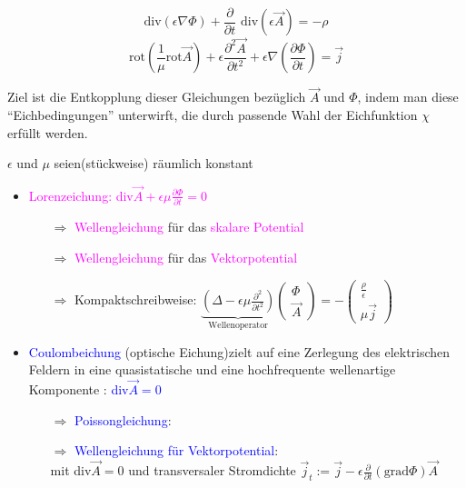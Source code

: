 \documentclass[]{article}
\begin{document}
	\begin{boxedminipage}[green]{\textwidth}
		$$\text{div}(\epsilon\nabla\Phi)+\frac{∂}{∂t}\text{ div}(\epsilon\vec{A})=-\rho$$
		$$\text{rot}(\frac{1}{\mu}\text{rot}\vec{A})+\epsilon \frac{∂^2\vec{A}}{∂t^2}+\epsilon \nabla(\frac{∂\Phi}{∂t})=\vec{j}$$
	\end{boxedminipage}
	
	Ziel ist die Entkopplung dieser Gleichungen bezüglich $\vec{A}$ und $\Phi$, indem man diese  "`Eichbedingungen"' unterwirft, die durch passende Wahl der Eichfunktion $\chi$ erfüllt werden.

\newpage

 	$\epsilon$ und $\mu$ seien(stückweise) räumlich konstant
	
	\begin{itemize}
		\item 
			\textcolor{magenta}{Lorenzeichung: div$\vec{A}+\epsilon\mu\frac{∂\Phi}{∂t}=0$} 
		\begin{itemize}
			\item[$\Rightarrow$] 
				\textcolor{magenta}{Wellengleichung} für das \textcolor{magenta}{skalare Potential} 
			\item[$\Rightarrow$] 
				\textcolor{magenta}{Wellengleichung} für das \textcolor{magenta}{Vektorpotential} 
			\item[$\Rightarrow$] 
				Kompaktschreibweise: $\underbrace{(\Delta - \epsilon\mu \frac{∂^2}{∂t^2})}_\text{Wellenoperator}\begin{pmatrix}\Phi \\ \vec{A}\end{pmatrix}=-\begin{pmatrix}\frac{\rho}{\epsilon}\\\mu\vec{j}\end{pmatrix}$
		\end{itemize} 
		\item 
			\textcolor{blue}{Coulombeichung }(optische Eichung)zielt auf eine Zerlegung des elektrischen Feldern in eine quasistatische und eine hochfrequente wellenartige Komponente 			: \textcolor{blue}{div$\vec{A}=0$}
		\begin{itemize}
			\item[$\Rightarrow$] 
				\textcolor{blue}{Poissongleichung}: 	
				
			\item[$\Rightarrow$] 
				\textcolor{blue}{Wellengleichung für Vektorpotential}:\ \\mit div$\vec{A}=0$ und transversaler Stromdichte $\vec{j}_t:=\vec{j}-\epsilon\frac{∂}{∂t}(\text{grad}\Phi)$$\vec{A}$ 
		\end{itemize} 	
	\end{itemize}
	
\end{document}
